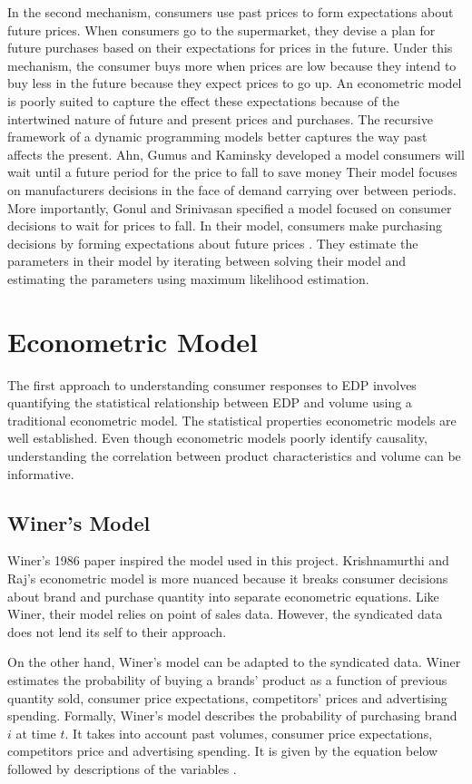 \documentclass{article}
\begin{document}
In the second mechanism, consumers use past prices to form expectations about future prices. When consumers go to the supermarket, they devise a plan for future purchases based on their expectations for prices in the future. Under this mechanism, the consumer buys more when prices are low because they intend to buy less in the future because they expect prices to go up. An econometric model is poorly suited to capture the effect these expectations because of the intertwined nature of future and present prices and purchases. The recursive framework of a dynamic programming models better captures the way past affects the present. Ahn, Gumus and Kaminsky developed a model consumers will wait until a future period for the price to fall to save money \cite{ahn}  Their model focuses on manufacturers decisions in the face of demand carrying over between periods. More importantly, Gonul and Srinivasan specified a model focused on consumer decisions to wait for prices to fall. In their model, consumers make purchasing decisions by forming expectations about future prices \cite{gonul}. They estimate the parameters in their model by iterating between solving their model and estimating the parameters using maximum likelihood estimation.

\section{Econometric Model}

The first approach to understanding consumer responses to EDP involves quantifying the statistical relationship between EDP and volume using a traditional econometric model. The statistical properties econometric models are well established. Even though econometric models poorly identify causality, understanding the correlation between product characteristics and volume can be informative.

\subsection{Winer's Model}

Winer's 1986 paper inspired the model used in this project. Krishnamurthi and Raj's econometric model is more nuanced because it breaks consumer decisions about brand and purchase quantity into separate econometric equations. Like Winer, their model relies on point of sales data. However, the syndicated data does not lend its self to their approach. 

On the other hand, Winer's model can be adapted to the syndicated data. Winer estimates the probability of buying a brands' product as a function of previous quantity sold, consumer price expectations, competitors' prices and advertising spending. Formally, Winer's model describes the probability of purchasing brand $i$ at time $t$. It takes into account past volumes, consumer price expectations, competitors price and advertising spending. It is given by the equation below followed by descriptions of the variables \cite{winer}. \\
\end{document}
